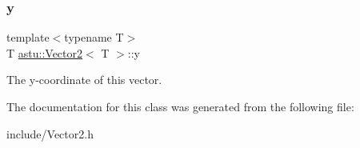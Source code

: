 \subsubsection{\texorpdfstring{y}{y}}
{\footnotesize\ttfamily template$<$typename T$>$ \\
T \hyperlink{classastu_1_1Vector2}{astu\+::\+Vector2}$<$ T $>$\+::y}

The y-\/coordinate of this vector. 

The documentation for this class was generated from the following file\+:\begin{DoxyCompactItemize}
\item 
include/Vector2.\+h\end{DoxyCompactItemize}
